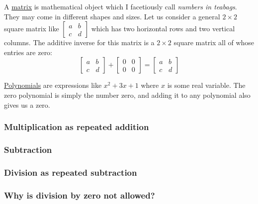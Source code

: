 \documentclass[
  a4paper,
]{article}
\begin{document}
A \href{https://mathworld.wolfram.com/Matrix.html}{matrix} is
mathematical object which I facetiously call \emph{numbers in teabags}.
They may come in different shapes and sizes. Let us consider a general
\(2 \times 2\) square matrix like
\(\begin{bmatrix}a & b\\c & d\end{bmatrix}\) which has two horizontal
rows and two vertical columns. The additive inverse for this matrix is a
\(2\times2\) square matrix all of whose entries are zero: \[
\begin{bmatrix}
a & b\\
c & d
\end{bmatrix}
+
\begin{bmatrix}
0 & 0\\
0 & 0
\end{bmatrix}
=
\begin{bmatrix}
a & b\\
c & d
\end{bmatrix}
\]

\href{https://mathworld.wolfram.com/Polynomial.html}{Polynomials} are
expressions like \(x^2 + 3x + 1\) where \(x\) is some real variable. The
zero polynomial is simply the number zero, and adding it to any
polynomial also gives us a zero.

\hypertarget{multiplication-as-repeated-addition}{%
\subsubsection{Multiplication as repeated
addition}\label{multiplication-as-repeated-addition}}

\hypertarget{subtraction}{%
\subsubsection{Subtraction}\label{subtraction}}

\hypertarget{division-as-repeated-subtraction}{%
\subsubsection{Division as repeated
subtraction}\label{division-as-repeated-subtraction}}

\hypertarget{why-is-division-by-zero-not-allowed}{%
\subsubsection{Why is division by zero not
allowed?}\label{why-is-division-by-zero-not-allowed}}
\end{document}
